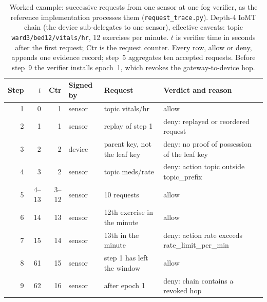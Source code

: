 \begin{table}[htbp]
\centering
\caption{Worked example: successive requests from one sensor at one fog verifier, as the reference implementation processes them (\texttt{request\_trace.py}). Depth-4 IoMT chain (the device sub-delegates to one sensor), effective caveats: topic \texttt{ward3/bed12/vitals/hr}, 12 exercises per minute. $t$ is verifier time in seconds after the first request; Ctr is the request counter. Every row, allow or deny, appends one evidence record; step~5 aggregates ten accepted requests. Before step~9 the verifier installs epoch~1, which revokes the gateway-to-device hop.}
\label{tab:trace}
\begin{tabular}{r r r l l l}
\toprule
Step & $t$ & Ctr & Signed by & Request & Verdict and reason \\
\midrule
1 & 0 & 1 & sensor & topic vitals/hr & allow \\
2 & 1 & 1 & sensor & replay of step 1 & deny: replayed or reordered request \\
3 & 2 & 2 & device & parent key, not the leaf key & deny: no proof of possession of the leaf key \\
4 & 3 & 2 & sensor & topic meds/rate & deny: action topic outside topic\_prefix \\
5 & 4--13 & 3--12 & sensor & 10 requests & allow \\
6 & 14 & 13 & sensor & 12th exercise in the minute & allow \\
7 & 15 & 14 & sensor & 13th in the minute & deny: action rate exceeds rate\_limit\_per\_min \\
8 & 61 & 15 & sensor & step 1 has left the window & allow \\
9 & 62 & 16 & sensor & after epoch 1 & deny: chain contains a revoked hop \\
\bottomrule
\end{tabular}
\end{table}
